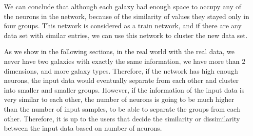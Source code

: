 We can conclude that although each galaxy had enough space to occupy any of the neurons in the network, because of the similarity of values they stayed only in four groups.
This network is considered as a train network, and if there are any data set with similar entries, we can use this network to cluster the new data set.

As we show in the following sections, in the real world with the real data, we never have two galaxies with exactly the same information, we have more than 2 dimensions, and more galaxy types. 
Therefore, if the network has high enough neurons, the input data would eventually separate from each other and cluster into smaller and smaller groups. 
However, if the information of the input data is very similar to each other, the number of neurons is going to be much higher than the number of input samples, to be able to separate the groups from each other. 
Therefore, it is up to the users that decide the similarity or dissimilarity between the input data based on number of neurons. 


